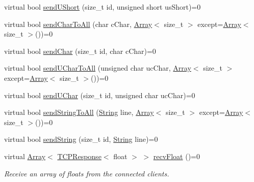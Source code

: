 \begin{DoxyCompactItemize}
\item 
virtual bool \mbox{\hyperlink{class_rad_j_a_v_1_1_networking_1_1_tcpip_server_a221f21ee42048f24ccc8d74a32f971ad}{send\+U\+Short}} (size\+\_\+t id, unsigned short us\+Short)=0
\item 
virtual bool \mbox{\hyperlink{class_rad_j_a_v_1_1_networking_1_1_tcpip_server_aa6299798c9db568bd94f3f616226340a}{send\+Char\+To\+All}} (char c\+Char, \mbox{\hyperlink{class_rad_j_a_v_1_1_array}{Array}}$<$ size\+\_\+t $>$ except=\mbox{\hyperlink{class_rad_j_a_v_1_1_array}{Array}}$<$ size\+\_\+t $>$())=0
\item 
virtual bool \mbox{\hyperlink{class_rad_j_a_v_1_1_networking_1_1_tcpip_server_a33e4e498ee3e4425cf3b550bf5c9da4f}{send\+Char}} (size\+\_\+t id, char c\+Char)=0
\item 
virtual bool \mbox{\hyperlink{class_rad_j_a_v_1_1_networking_1_1_tcpip_server_a645c0fa1c860658c7ab04a9fcf530b9a}{send\+U\+Char\+To\+All}} (unsigned char uc\+Char, \mbox{\hyperlink{class_rad_j_a_v_1_1_array}{Array}}$<$ size\+\_\+t $>$ except=\mbox{\hyperlink{class_rad_j_a_v_1_1_array}{Array}}$<$ size\+\_\+t $>$())=0
\item 
virtual bool \mbox{\hyperlink{class_rad_j_a_v_1_1_networking_1_1_tcpip_server_afd54d5c1dc235937aca670bbd9b86875}{send\+U\+Char}} (size\+\_\+t id, unsigned char uc\+Char)=0
\item 
virtual bool \mbox{\hyperlink{class_rad_j_a_v_1_1_networking_1_1_tcpip_server_ab5ea43765510f9d8b9e242e676d5b70b}{send\+String\+To\+All}} (\mbox{\hyperlink{class_rad_j_a_v_1_1_string}{String}} line, \mbox{\hyperlink{class_rad_j_a_v_1_1_array}{Array}}$<$ size\+\_\+t $>$ except=\mbox{\hyperlink{class_rad_j_a_v_1_1_array}{Array}}$<$ size\+\_\+t $>$())=0
\item 
virtual bool \mbox{\hyperlink{class_rad_j_a_v_1_1_networking_1_1_tcpip_server_a96df6c32b4f3db9900c84224d1fabd5b}{send\+String}} (size\+\_\+t id, \mbox{\hyperlink{class_rad_j_a_v_1_1_string}{String}} line)=0
\item 
virtual \mbox{\hyperlink{class_rad_j_a_v_1_1_array}{Array}}$<$ \mbox{\hyperlink{class_rad_j_a_v_1_1_networking_1_1_t_c_p_response}{T\+C\+P\+Response}}$<$ float $>$ $>$ \mbox{\hyperlink{class_rad_j_a_v_1_1_networking_1_1_tcpip_server_ac4c82b498b48e5f4731063c335c28d74}{recv\+Float}} ()=0
\begin{DoxyCompactList}\small\item\em Receive an array of floats from the connected clients. \end{DoxyCompactList}\item 

\end{DoxyCompactItemize}
